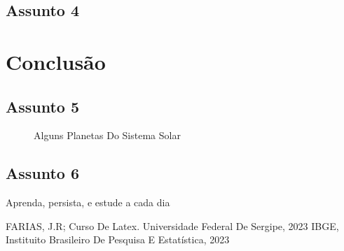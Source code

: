 \documentclass[a4paper,12pt, oneside]{book}
\begin{document}
\section{Assunto 4}

\chapter{Conclusão}
\section{Assunto 5}

	\begin{figure}[h]
		\centering
		\caption{Alguns Planetas Do Sistema Solar}\label{FigSistema}
		
	\end{figure}

\section{Assunto 6}

Aprenda, persista, e estude a cada dia \cite{FARIAS}


\begin{thebibliography}{2}

	 FARIAS, J.R; Curso De Latex. Universidade Federal De Sergipe, 2023 
	 IBGE, Instituito Brasileiro De Pesquisa E Estatística, 2023

\end{thebibliography}

\printindex
\end{document}
